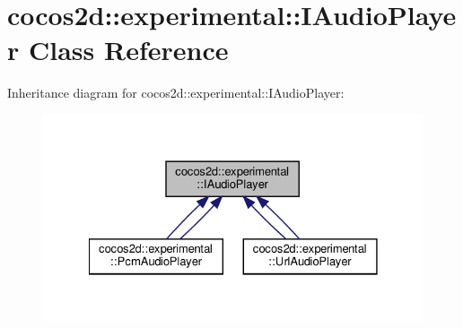 \hypertarget{classcocos2d_1_1experimental_1_1IAudioPlayer}{}\section{cocos2d\+:\+:experimental\+:\+:I\+Audio\+Player Class Reference}
\label{classcocos2d_1_1experimental_1_1IAudioPlayer}


Inheritance diagram for cocos2d\+:\+:experimental\+:\+:I\+Audio\+Player\+:
\nopagebreak
\begin{figure}[H]
\begin{center}
\leavevmode
\includegraphics[width=328pt]{classcocos2d_1_1experimental_1_1IAudioPlayer__inherit__graph}
\end{center}
\end{figure}
